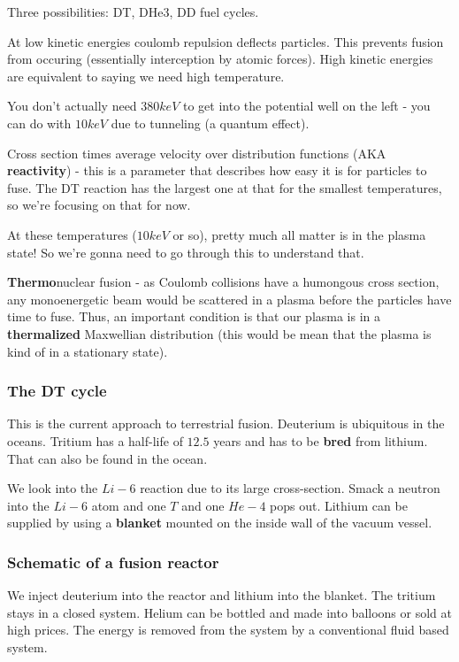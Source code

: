 \documentclass[PlasmaNotes.tex]{subfiles}
\begin{document}
Three possibilities: DT, DHe3, DD fuel cycles.

At low kinetic energies coulomb repulsion deflects particles. This prevents fusion from occuring (essentially interception by atomic forces). High kinetic energies are equivalent to saying we need high temperature.

You don't actually need $380 keV$ to get into the potential well on the left - you can do with $10 keV$ due to tunneling (a quantum effect).


Cross section times average velocity over distribution functions (AKA \textbf{reactivity}) - this is a parameter that describes how easy it is for particles to fuse. The DT reaction has the largest one at that for the smallest temperatures, so we're focusing on that for now.

At these temperatures ($10 keV$ or so), pretty much all matter is in the plasma state! So we're gonna need to go through this to understand that.

\textbf{Thermo}nuclear fusion - as Coulomb collisions have a humongous cross section, any monoenergetic beam would be scattered in a plasma before the particles have time to fuse. Thus, an important condition is that our plasma is in a \textbf{thermalized} Maxwellian distribution (this would be mean that the plasma is kind of in a stationary state).

\subsubsection{The DT cycle}


This is the current approach to terrestrial fusion. Deuterium is ubiquitous in the oceans. Tritium has a half-life of $12.5$ years and has to be \textbf{bred} from lithium. That can also be found in the ocean.

We look into the $Li-6$ reaction due to its large cross-section. Smack a neutron into the $Li-6$ atom and one $T$ and one $He-4$ pops out. Lithium can be supplied by using a \textbf{blanket} mounted on the inside wall of the vacuum vessel.

\subsubsection{Schematic of a fusion reactor}

We inject deuterium into the reactor and lithium into the blanket. The tritium stays in a closed system. Helium can be bottled and made into balloons or sold at high prices. The energy is removed from the system by a conventional fluid based system.
\end{document}
